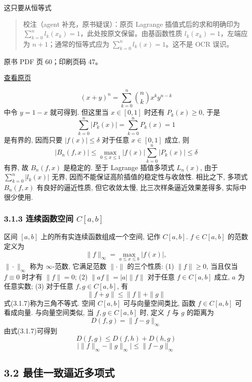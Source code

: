 这只要从恒等式

\begin{quote}
校注（agent 补充，原书疑误）：原页 Lagrange 插值式后的求和明确印为 \(\sum_{k=0}^{n}l_k(x_k)=1\)，此处按原文保留。由基函数性质 \(l_k(x_k)=1\)，左端应为 \(n+1\)；通常的恒等式应为 \(\sum_{k=0}^{n}l_k(x)=1\)。这不是 OCR 误识。
\end{quote}

\clearpage

原书 PDF 页 60；印刷页码 47。

\href{source-images/pdf-060.jpeg}{查看原页}

\[
(x+y)^n = \sum_{k=0}^{n} \binom{n}{k} x^k y^{n-k} \tag{3.1.6}
\] 中令 \(y=1-x\) 就可得到. 但这里当 \(x \in [0,1]\) 时还有 \(P_k(x) \geqslant 0\), 于是 \[
\sum_{k=0}^{n} |P_k(x)| = \sum_{k=0}^{n} P_k(x) = 1
\] 是有界的, 因而只要 \(|f(x)| \leqslant \delta\) 对于任意 \(x \in [0,1]\) 成立, 则 \[
|B_n(f,x)| \leqslant \max_{0 \leqslant x \leqslant 1} |f(x)| \sum_{k=0}^{n} |P_k(x)| \leqslant \delta
\] 有界, 故 \(B_n(f,x)\) 是稳定的. 至于 Lagrange 插值多项式 \(L_n(x)\), 由于 \(\sum_{k=0}^{n} |l_k(x)|\) 无界, 因而不能保证高阶插值的稳定性与收敛性. 相比之下, 多项式 \(B_n(f,x)\) 有良好的逼近性质, 但它收敛太慢, 比三次样条逼近效果差得多, 实际中很少使用.

\subsubsection{\texorpdfstring{3.1.3 连续函数空间 \(C[a,b]\)}{3.1.3 连续函数空间 C{[}a,b{]}}}\label{ch03a-ux8fdeux7eedux51fdux6570ux7a7aux95f4-cab}

区间 \([a,b]\) 上的所有实连续函数组成一个空间, 记作 \(C[a,b]\). \(f \in C[a,b]\) 的范数定义为 \[
\|f\|_\infty = \max_{a \leqslant x \leqslant b} |f(x)| ,
\] \(\|\cdot\|_\infty\) 称为 \(\infty\)-范数, 它满足范数 \(\|\cdot\|\) 的三个性质: (1) \(\|f\| \geqslant 0\), 当且仅当 \(f \equiv 0\) 时才有 \(\|f\| = 0\); (2) \(\|af\| = |a| \|f\|\) 对于任意 \(f \in C[a,b]\) 成立, \(a\) 为任意实数; (3) 对于任意 \(f,g \in C[a,b]\), 有 \[
\|f+g\| \leqslant \|f\| + \|g\| \tag{3.1.7}
\] 式(3.1.7)称为三角不等式. 空间 \(C[a,b]\) 可与向量空间类比, 函数 \(f \in C[a,b]\) 可看成向量. 与向量空间类似, 当 \(f,g \in C[a,b]\) 时, 定义 \(f\) 与 \(g\) 的距离为 \[
D(f,g) = \|f-g\|_\infty \tag{3.1.8}
\] 由式(3.1.7)可得到 \[
D(f,g) \leqslant D(f,h) + D(h,g) \tag{3.1.9}
\] \[
\bigl|\|f\|_\infty - \|g\|_\infty\bigr| \leqslant \|f-g\|_\infty \tag{3.1.10}
\]

\subsection{3.2 最佳一致逼近多项式}\label{ch03a-ux6700ux4f73ux4e00ux81f4ux903cux8fd1ux591aux9879ux5f0f}

